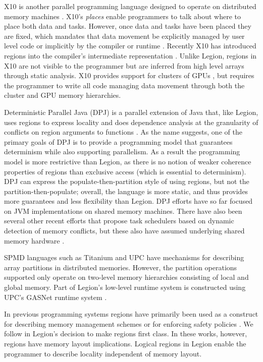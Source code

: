 X10 is another parallel programming language designed to operate on
distributed memory machines \cite{X1005}.  X10's {\em places} enable
programmers to talk about where to place both data and tasks.
However, once data and tasks have been placed they are fixed, which
mandates that data movement be explicitly managed by user level code
or implicitly by the compiler or runtime \cite{X1008}.  Recently X10
has introduced regions into the compiler's
intermediate representation \cite{X1011}.  Unlike Legion, regions in
X10 are not visible to the programmer but are inferred from high level
arrays through static analysis.  X10 provides support for clusters of
GPUs \cite{X10GPU}, but requires the programmer to write all code
managing data movement through both the cluster and GPU memory
hierarchies.

Deterministic Parallel Java (DPJ) is a parallel extension of Java
that, like Legion, uses regions to express locality and does
dependence analysis at the granularity of conflicts on region
arguments to functions \cite{Bocchino09}.  As the name suggests, one
of the primary goals of DPJ is to provide a programming model that
guarantees determinism while also supporting parallelism.
As a result the programming model is more restrictive than Legion, as
there is no notion of weaker coherence properties of regions than
exclusive access (which is essential to determinism).  DPJ can express
the populate-then-partition style of using regions, but not the
partition-then-populate; overall, the language is more static, and
thus provides more guarantees and less flexibility than Legion.  
DPJ efforts have so far focused on JVM implementations on shared memory machines.
There have also been several other recent efforts that propose task schedulers
based on dynamic detection of memory conflicts, but these also have assumed
underlying shared memory hardware \cite{VTN11,Tzenakis12,EYJD12}.

SPMD languages such as Titanium \cite{TIT98} and UPC \cite{UPC99} have
mechanisms for describing array partitions in distributed memories.
However, the partition operations supported only operate on two-level
memory hierarchies consisting of local and global memory. 
Part of Legion's
low-level runtime system is constructed using UPC's GASNet
runtime system \cite{GASNET07}.


In previous programming systems regions have primarily been used as a construct for
describing memory management schemes \cite{REAPS02,RC01}  
or for enforcing safety policies \cite{CYCLONE01}.  We follow \cite{RC01} in Legion's
decision to make regions first class.  In these works, however, regions have
memory layout implications.  Logical regions in Legion enable the programmer to
describe locality independent of memory layout.

